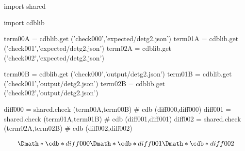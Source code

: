 \documentclass[12pt]{cdblatex}
\begin{document}
\section*{\jobname}


\begin{cadabra}
   import shared

   import cdblib

   term00A = cdblib.get ('check000','expected/detg2.json')
   term01A = cdblib.get ('check001','expected/detg2.json')
   term02A = cdblib.get ('check002','expected/detg2.json')

   term00B = cdblib.get ('check000','output/detg2.json')
   term01B = cdblib.get ('check001','output/detg2.json')
   term02B = cdblib.get ('check002','output/detg2.json')

   diff000 = shared.check (term00A,term00B)   # cdb (diff000,diff000)
   diff001 = shared.check (term01A,term01B)   # cdb (diff001,diff001)
   diff002 = shared.check (term02A,term02B)   # cdb (diff002,diff002)

\end{cadabra}

\begin{dgroup*}
   \Dmath*{ \cdb*{diff000} }
   \Dmath*{ \cdb*{diff001} }
   \Dmath*{ \cdb*{diff002} }
\end{dgroup*}
\end{document}
